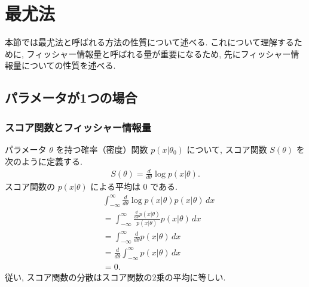 \documentclass{jarticle}
\begin{document}

\section{最尤法}
本節では最尤法と呼ばれる方法の性質について述べる. これについて理解するために, フィッシャー情報量と呼ばれる量が重要になるため, 先にフィッシャー情報量についての性質を述べる. 

\subsection{パラメータが1つの場合}

\subsubsection{スコア関数とフィッシャー情報量}
パラメータ $\theta$ を持つ確率（密度）関数 $p(x|\theta_0)$ について, スコア関数 $S(\theta)$ を次のように定義する. 
\begin{align}
S(\theta) = \frac{d}{d\theta}\log p(x | \theta). 
\end{align}
スコア関数の $p(x|\theta)$ による平均は 0 である.  
\begin{align}
&\int_{-\infty}^{\infty} \frac{d}{d\theta}\log p(x | \theta) p(x|\theta)\, dx \\
&= \int_{-\infty}^{\infty} \frac{\frac{d}{d\theta}p(x | \theta)}{p(x | \theta)} p(x|\theta) \, dx \\
&=\int_{-\infty}^{\infty} \frac{d}{d\theta}p(x | \theta)\, dx \\
&=  \frac{d}{d\theta} \int_{-\infty}^{\infty} p(x | \theta)\, dx\\
&= 0.
\end{align}
従い, スコア関数の分散はスコア関数の2乗の平均に等しい.
\end{document}
